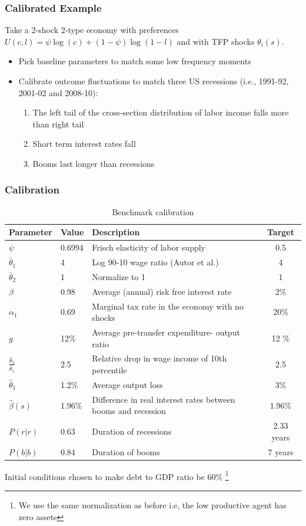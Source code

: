 \documentclass{beamer}
\begin{document}
\begin{frame}
 \frametitle{Calibrated Example}
Take a 2-shock 2-type economy with preferences $U(c,l)=\psi \log(c)+(1-\psi)\log(1-l)$ and with TFP shocks $\theta_i(s)$.

 \begin{itemize}

 \item Pick  baseline parameters to match some low frequency moments

 \item Calibrate outcome fluctuations to match three US recessions (i.e., 1991-92, 2001-02 and 2008-10):

 \begin{enumerate}
  \item The left tail of the cross-section distribution of labor income falls more than right tail
  \item Short term interest rates fall
  \item Booms last longer than recessions
 \end{enumerate}

 \end{itemize}

\end{frame}



\begin{frame}
 \frametitle{Calibration}

{\tiny
\begin{table}[htp]
{\tiny
\begin{tabular}{|l|l|l|c|}
\hline
Parameter & Value & Description &Target   \\ \hline
$\psi$ & 0.6994 &Frisch elasticity of labor supply & 0.5   \\
$\bar{\theta}_1 $ & 4& Log 90-10 wage ratio (Autor et al.) & 4   \\
$\bar{\theta}_2 $ & 1 &Normalize to 1 & 1  \\
$\beta$ & 0.98  &Average (annual) risk free interest rate & 2\%   \\
$\alpha_1$ & 0.69 & Marginal tax rate in the economy with no shocks & 20\% \\
$g$ & 12\%&Average pre-transfer expenditure- output ratio & 12 \% \\
$\frac{\hat {\theta}_2}{\hat {\theta}_1}$ & 2.5 & Relative drop in wage income of 10th
percentile & 2.5\\
$\hat{\theta}_1$ & 1.2\% & Average output loss& 3\% \\
$\hat{\beta}(s)$ & 1.96\%& Difference in real interest rates between booms and recession& 1.96\% \\
$P(r|r)$ & 0.63&Duration of recessions & 2.33 years \\
$P(b|b)$ & 0.84 &Duration of booms &7 years \\ \hline
\end{tabular}
}
\caption{Benchmark calibration}
\label{tab:Parameters}
\end{table}
}
Initial conditions chosen to make  debt to GDP ratio be 60\% \footnote{We use the same normalization as before i.e, the low productive agent has zero assets}
 \end{frame}
\end{document}
